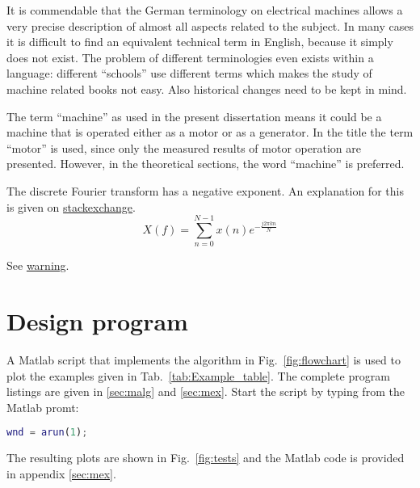 It is commendable that the German terminology on electrical machines allows a very precise description of almost all aspects related to the subject. In many cases it is difficult to find an equivalent technical term in English, because it simply does not exist. The problem of different terminologies even exists within a language: different ``schools'' use different terms which makes the study of machine related books not easy. Also historical changes need to be kept in mind.

The term ``machine'' as used in the present dissertation means it could be a machine that is operated either as a motor or as a generator. In the title the term ``motor'' is used, since only the measured results of motor operation are presented. However, in the theoretical sections, the word ``machine'' is preferred.  

The discrete Fourier transform has a negative exponent. An explanation for this is given on 
\href{http://dsp.stackexchange.com/questions/19004/why-is-a-negative-exponent-present-in-fourier-and-laplace-transform}{stackexchange}.
\begin{equation}
 X(f)=\sum_{n=0}^{N-1}x(n)e^{-\frac{j2πkn}{N}}
\end{equation}

See \href{http://octave.1599824.n4.nabble.com/Warning-Matlab-style-short-circuit-operation-performed-for-operator-td4680361.html}{warning}.


\section{Design program}
A Matlab script that implements the algorithm in Fig.~\ref{fig:flowchart} is used to plot the examples given in Tab.~\ref{tab:Example_table}. The complete program listings are given in \ref{sec:malg} and \ref{sec:mex}. Start the script by typing from the Matlab promt:

\begin{lstlisting}[language=matlab]
wnd = arun(1);
\end{lstlisting}
The resulting plots are shown in Fig.~\ref{fig:tests} and the Matlab code is provided in appendix \ref{sec:mex}.



